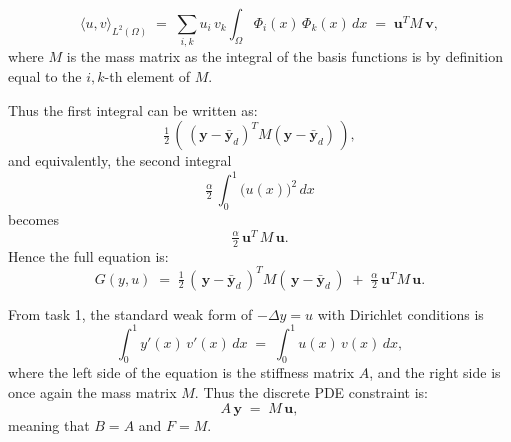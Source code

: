 \documentclass[a4paper,10pt]{article}
\begin{document}
\[
\langle u,v\rangle_{L^2(\Omega)}
\;=\;
\sum_{i,k} u_{i}\,v_{k}\int_{\Omega}\Phi_{i}(x)\,\Phi_{k}(x)\,dx
\;=\;
\mathbf{u}^{T}M\,\mathbf{v},
\]
where $M$ is the mass matrix as the integral of the basis functions is by definition equal to the $i,k$-th
element of $M$.

\medskip

\noindent
Thus the first integral can be written as:
\[
\tfrac12\,(\,(\mathbf{y}-\bar{\mathbf{y}}_{d})^{T}M(\mathbf{y}-\bar{\mathbf{y}}_{d})\,),
\]
and equivalently, the second integral
\[
\tfrac{\alpha}{2}\,\int_{0}^{1}\bigl(u(x)\bigr)^{2}\,dx
\]
becomes
\[
\tfrac{\alpha}{2}\,\mathbf{u}^{T}\,M\,\mathbf{u}.
\]
Hence the full equation is:
\[
G(y,u)
\;=\;
\tfrac12\,(\,\mathbf{y}-\bar{\mathbf{y}}_{d}\,)^{T}M(\,\mathbf{y}-\bar{\mathbf{y}}_{d}\,)
\;+\;
\tfrac{\alpha}{2}\,\mathbf{u}^{T}M\,\mathbf{u}.
\]

\bigskip

\noindent
From task 1, the standard weak form of $-\Delta y = u$ with Dirichlet conditions is
\[
\int_{0}^{1}y'(x)\,v'(x)\,dx
\;=\;
\int_{0}^{1}u(x)\,v(x)\,dx,
\]
where the left side of the equation is the stiffness matrix $A$, and the right side is once again the mass matrix $M$.
Thus the discrete PDE constraint is:
\[
A\,\mathbf{y}\;=\;M\,\mathbf{u},
\]
meaning that $B = A$ and $F = M$.
\end{document}
